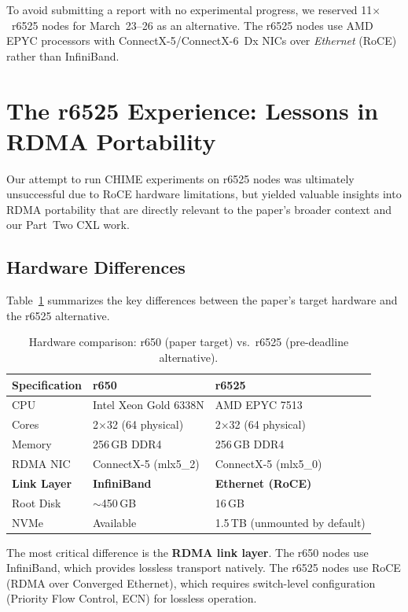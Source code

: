 \documentclass[11pt,a4paper]{article}
\begin{document}
To avoid submitting a report with no experimental progress, we reserved 11$\times$~r6525 nodes for March~23--26 as an alternative. The r6525 nodes use AMD EPYC processors with ConnectX-5/ConnectX-6~Dx NICs over \emph{Ethernet} (RoCE) rather than InfiniBand.

\section{The r6525 Experience: Lessons in RDMA Portability}
\label{sec:r6525}

Our attempt to run CHIME experiments on r6525 nodes was ultimately unsuccessful due to RoCE hardware limitations, but yielded valuable insights into RDMA portability that are directly relevant to the paper's broader context and our Part~Two CXL work.

\subsection{Hardware Differences}

Table~\ref{tab:hardware} summarizes the key differences between the paper's target hardware and the r6525 alternative.

\begin{table}[H]
\centering
\caption{Hardware comparison: r650 (paper target) vs.\ r6525 (pre-deadline alternative).}
\label{tab:hardware}
\begin{tabular}{@{}lll@{}}
\toprule
\textbf{Specification} & \textbf{r650} & \textbf{r6525} \\
\midrule
CPU & Intel Xeon Gold 6338N & AMD EPYC 7513 \\
Cores & 2$\times$32 (64 physical) & 2$\times$32 (64 physical) \\
Memory & 256\,GB DDR4 & 256\,GB DDR4 \\
RDMA NIC & ConnectX-5 (mlx5\_2) & ConnectX-5 (mlx5\_0) \\
\textbf{Link Layer} & \textbf{InfiniBand} & \textbf{Ethernet (RoCE)} \\
Root Disk & $\sim$450\,GB & 16\,GB \\
NVMe & Available & 1.5\,TB (unmounted by default) \\
\bottomrule
\end{tabular}
\end{table}

The most critical difference is the \textbf{RDMA link layer}. The r650 nodes use InfiniBand, which provides lossless transport natively. The r6525 nodes use RoCE (RDMA over Converged Ethernet), which requires switch-level configuration (Priority Flow Control, ECN) for lossless operation.
\end{document}
